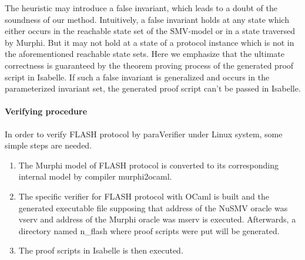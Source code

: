 \documentclass{llncs}
\newlength{\fminilength}
\newenvironment{fmini}[1][\linewidth]
  {\setlength{\fminilength}{#1\fboxsep-2\fboxrule}%
   \vspace{2ex}\noindent\begin{lrbox}{\fminibox}\begin{minipage}{\fminilength}%
   \mbox{ }\hfill\vspace{-2.5ex}}%
  {\end{minipage}\end{lrbox}\vspace{1ex}\hspace{0ex}%
   \framebox{\usebox{\fminibox}}}
\newenvironment{specification}
{\noindent\scriptsize
\tt\begin{fmini}\begin{tabbing}X\=X12345\=XXXX\=XXXX\=XXXX\=XXXX\=XXXX
\=\+\kill} {\end{tabbing}\normalfont\end{fmini}}
\newcommand{\bedt}[1]{{\color{blue}#1}}
\newcommand{\forget}[1]{}
\begin{document}
 The \bedt{heuristic} may introduce a false invariant, which leads to a doubt of the soundness of our method.  Intuitively, a  false invariant holds at any   state which either occurs in the reachable state set of the SMV-model or in a state traversed by Murphi. But it may not hold at a state of a protocol instance which is not in the aforementioned reachable state sets. Here we emphasize that the ultimate correctness is guaranteed by the theorem proving process of the generated proof script in Isabelle. If such a false invariant is generalized and occurs in the parameterized invariant set, the generated proof script can't be passed in Isabelle.

\vspace{-10pt}
\paragraph{Verifying \bedt{procedure}}  In order to verify FLASH protocol by {\sf paraVerifier} under Linux system, some simple steps are needed.

\begin{enumerate}
\item The Murphi model of FLASH protocol is converted to its corresponding internal model by compiler {\sf murphi2ocaml}.
\item The specific verifier for FLASH protocol with OCaml is built and the generated executable file supposing that address of the NuSMV oracle was {\sf vserv} and address of the Murphi oracle was {\sf mserv} is executed. Afterwards, a directory named {\sf n\_flash} where proof scripts were put will be generated.
\item The proof scripts in Isabelle is then executed.
\end{enumerate}

\forget{
Firstly, we convert Murphi model of FLASH protocol to its corresponding internal model by compiler {\sf murphi2ocaml} supposing that the compiler was put in path {\sf\$\{moc\}}.

\begin{specification}
  \$ python \$\{moc\}/gen.py -m flash.m > flash.ml
\end{specification}

Secondly, we build the specific verifier for FLASH protocol with OCaml and run the generated executable file supposing that address of the NuSMV oracle was {\sf vserv} and address of the Murphi oracle was {\sf mserv}. Afterwards, a directory named {\sf n\_flash} where proof scripts were put will be generated.

\begin{specification}
  corebuild flash.byte -pkg re2 -I src\\
  ./flash.byte -vh vserv -mh mserv
\end{specification}

Finally, we run the proof scripts in Isabelle.

\begin{specification}
  cd n\_flash\\
  ./run.sh
\end{specification}
}
\end{document}

